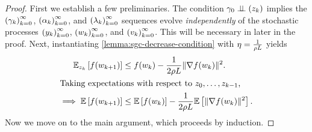 \estimatingSequenceBound*
\begin{proof}
    First we establish a few preliminaries.
    The condition \( \gamma_0 \perp \!\!\! \perp \left(z_{k}\right) \) implies the \( \left(\gamma_k\right)_{k=0}^\infty \), \( \left(\alpha_k\right)_{k=0}^\infty \), and \( \left(\lambda_k\right)_{k=0}^\infty \) sequences evolve \emph{independently} of the stochastic processes \( \left(y_k\right)_{k=0}^\infty \), \( \left(w_k\right)_{k=0}^\infty \), and \( \left(v_k\right)_{k=0}^\infty \).
    This will be necessary in later in the proof.
    Next, instantiating \autoref{lemma:sgc-decrease-condition} with \( \eta = \frac{1}{\rho L} \) yields
    \begin{align}
        \mathbb{E}_{z_{k}} \left[f(w_{k+1})\right] &\leq f(w_k) - \frac{1}{2 \rho L} \|\nabla f(w_k)\|^2.\nonumber\\
            \intertext{Taking expectations with respect to \( z_0, \ldots, z_{k-1} \),}
        \implies \mathbb{E} \left[f(w_{k+1})\right] &\leq \mathbb{E}\left[f(w_k)\right] - \frac{1}{2 \rho L} \mathbb{E} \left[\|\nabla f(w_k)\|^2\right].\label{eq:expected-decrease}
    \end{align}
    Now we move on to the main argument, which proceeds by induction.\hfill \break


\end{proof}
